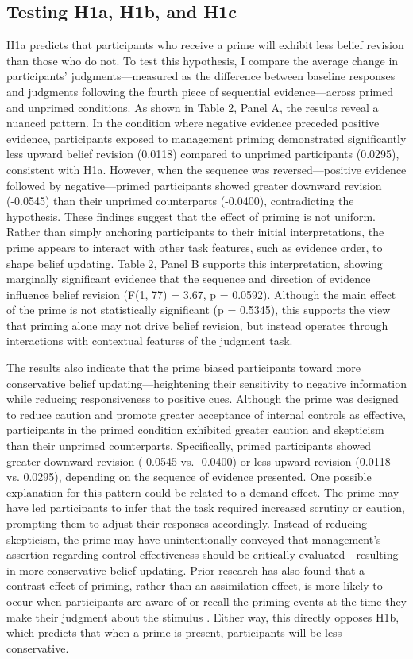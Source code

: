 \documentclass[12pt,english]{article}
\begin{document}
\subsection{Testing H1a, H1b, and H1c}
H1a predicts that participants who receive a prime will exhibit less belief revision than those who do not. To test this hypothesis, I compare the average change in participants’ judgments—measured as the difference between baseline responses and judgments following the fourth piece of sequential evidence—across primed and unprimed conditions. As shown in Table 2, Panel A, the results reveal a nuanced pattern. In the condition where negative evidence preceded positive evidence, participants exposed to management priming demonstrated significantly less upward belief revision (0.0118) compared to unprimed participants (0.0295), consistent with H1a. However, when the sequence was reversed—positive evidence followed by negative—primed participants showed greater downward revision (-0.0545) than their unprimed counterparts (-0.0400), contradicting the hypothesis. These findings suggest that the effect of priming is not uniform. Rather than simply anchoring participants to their initial interpretations, the prime appears to interact with other task features, such as evidence order, to shape belief updating. Table 2, Panel B supports this interpretation, showing marginally significant evidence that the sequence and direction of evidence influence belief revision (F(1, 77) = 3.67, p = 0.0592). Although the main effect of the prime is not statistically significant (p = 0.5345), this supports the view that priming alone may not drive belief revision, but instead operates through interactions with contextual features of the judgment task.

The results also indicate that the prime biased participants toward more conservative belief updating—heightening their sensitivity to negative information while reducing responsiveness to positive cues. Although the prime was designed to reduce caution and promote greater acceptance of internal controls as effective, participants in the primed condition exhibited greater caution and skepticism than their unprimed counterparts. Specifically, primed participants showed greater downward revision (-0.0545 vs. -0.0400) or less upward revision (0.0118 vs. 0.0295), depending on the sequence of evidence presented. One possible explanation for this pattern could be related to a demand effect. The prime may have led participants to infer that the task required increased scrutiny or caution, prompting them to adjust their responses accordingly. Instead of reducing skepticism, the prime may have unintentionally conveyed that management’s assertion regarding control effectiveness should be critically evaluated—resulting in more conservative belief updating. Prior research has also found that a contrast effect of priming, rather than an assimilation effect, is more likely to occur when participants are aware of or recall the priming events at the time they make their judgment about the stimulus \citep{higgins1996, martin1986, lombardi1987, loersch2016}. Either way, this directly opposes H1b, which predicts that when a prime is present, participants will be less conservative. 
\end{document}
